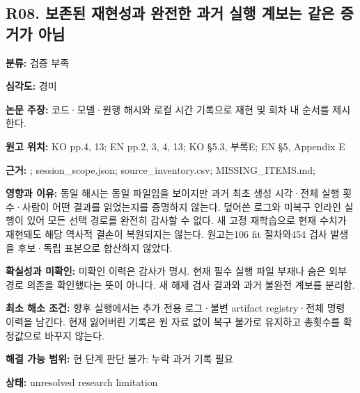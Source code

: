 \documentclass[11pt,a4paper]{article}
\begin{document}
\subsection*{R08. 보존된 재현성과 완전한 과거 실행 계보는 같은 증거가 아님}
\textbf{분류:} 검증 부족
\par
\textbf{심각도:} 경미
\par
\textbf{논문 주장:} 코드·모델·원행 해시와 로컬 시간 기록으로 재현 및 회차 내 순서를 제시한다.
\par
\textbf{원고 위치:} KO pp.4, 13; EN pp.2, 3, 4, 13; KO §5.3, 부록E; EN §5, Appendix E
\par
\textbf{근거:} ; session\_scope.json; source\_inventory.csv; MISSING\_ITEMS.md; 
\par
\textbf{영향과 이유:} 동일 해시는 동일 파일임을 보이지만 과거 최초 생성 시각·전체 실행 횟수·사람이 어떤 결과를 읽었는지를 증명하지 않는다. 덮어쓴 로그와 미복구 인라인 실행이 있어 모든 선택 경로를 완전히 감사할 수 없다. 새 고정 재학습으로 현재 수치가 재현돼도 해당 역사적 결손이 복원되지는 않는다. 원고는106 fit 절차와454 검사 발생을 후보·독립 표본으로 합산하지 않았다.
\par
\textbf{확실성과 미확인:} 미확인 이력은 감사가 명시. 현재 필수 실행 파일 부재나 숨은 외부 경로 의존을 확인했다는 뜻이 아니다. 새 해제 검사 결과와 과거 불완전 계보를 분리함.
\par
\textbf{최소 해소 조건:} 향후 실행에서는 추가 전용 로그·불변 artifact registry·전체 명령 이력을 남긴다. 현재 잃어버린 기록은 원 자료 없이 복구 불가로 유지하고 총횟수를 확정값으로 바꾸지 않는다.
\par
\textbf{해결 가능 범위:} 현 단계 판단 불가: 누락 과거 기록 필요
\par
\textbf{상태:} unresolved research limitation
\par
\end{document}
